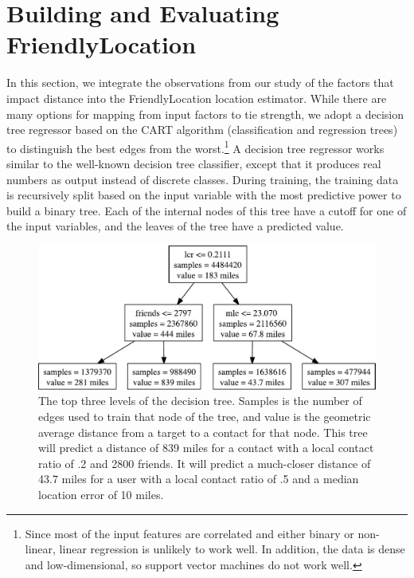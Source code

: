\documentclass{sig-alternate}
\begin{document}
\section{Building and Evaluating FriendlyLocation}

In this section, we integrate the observations from our study of the factors
that impact distance into the FriendlyLocation location estimator.
%
While there are many options for mapping from input factors to tie strength, we
adopt a decision tree regressor based on the CART algorithm (classification and
regression trees) to distinguish the best edges from the worst.\footnote{Since
    most of the input features are correlated and either binary or non-linear,
    linear regression is unlikely to work well.
    In addition, the data is dense and low-dimensional, so support vector machines
    do not work well.}
%
A decision tree regressor works similar to the well-known decision tree
classifier, except that it produces real numbers as output instead of discrete
classes.
%
During training, the training data is recursively split based on the input
variable with the most predictive power to build a binary tree.
%
Each of the internal nodes of this tree have a cutoff for one of the input
variables, and the leaves of the tree have a predicted value.


\begin{figure}[tb]
\centering
\includegraphics[width=.8\linewidth]{figures/tree_top.pdf}
\caption{
    The top three levels of the decision tree.
    Samples is the number of edges used to train that node of the tree, and
    value is the geometric average distance from a target to a contact for that
    node.
    This tree will predict a distance of 839 miles for a contact with a local
    contact ratio of .2 and 2800 friends.
    It will predict a much-closer distance of 43.7 miles for a user with a
    local contact ratio of .5 and a median location error of 10 miles.
}
\label{fig:TreeTop}
\vspace{-2pt}
\end{figure}
\end{document}
